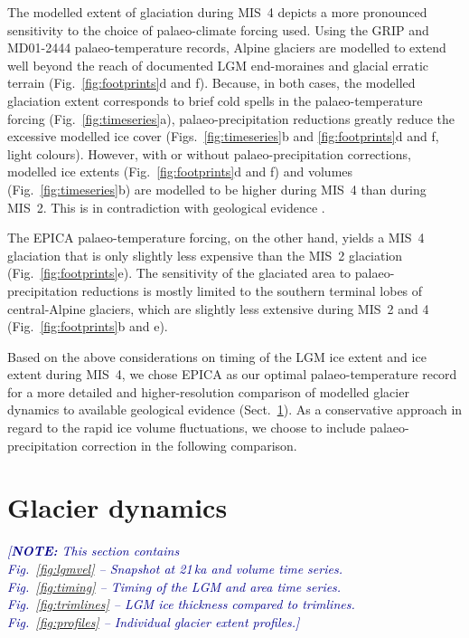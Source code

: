 \documentclass[tc, manuscript]{copernicus}
\newcommand{\note}[1]{\textcolor{darkblue}{\emph{[\textbf{NOTE:} #1]}}}
\begin{document}
    The modelled extent of glaciation during MIS~4 depicts a more pronounced
    sensitivity to the choice of palaeo-climate forcing used. Using the GRIP
    and MD01-2444 palaeo-temperature records, Alpine glaciers are modelled to
    extend well beyond the reach of documented LGM end-moraines and glacial
    erratic terrain (Fig.~\ref{fig:footprints}d and f). Because, in both cases,
    the modelled glaciation extent corresponds to brief cold spells in the
    palaeo-temperature forcing (Fig.~\ref{fig:timeseries}a),
    palaeo-precipitation reductions greatly reduce the excessive modelled ice
    cover (Figs.~\ref{fig:timeseries}b and \ref{fig:footprints}d and f, light
    colours). However, with or without palaeo-precipitation corrections,
    modelled ice extents (Fig.~\ref{fig:footprints}d and f) and volumes
    (Fig.~\ref{fig:timeseries}b) are modelled to be higher during MIS~4 than
    during MIS~2. This is in contradiction with geological evidence
    \citep{Preusser.2004, Ivy-Ochs.etal.2008}.

    The EPICA palaeo-temperature forcing, on the other hand, yields a MIS~4
    glaciation that is only slightly less expensive than the MIS~2 glaciation
    (Fig.~\ref{fig:footprints}e). The sensitivity of the glaciated area to
    palaeo-precipitation reductions is mostly limited to the southern terminal
    lobes of central-Alpine glaciers, which are slightly less extensive during
    MIS~2 and 4 (Fig.~\ref{fig:footprints}b and e).

    Based on the above considerations on timing of the LGM ice extent and ice
    extent during MIS~4, we chose EPICA as our optimal palaeo-temperature
    record for a more detailed and higher-resolution comparison of modelled
    glacier dynamics to available geological evidence
    (Sect.~\ref{sec:results}). As a conservative approach in regard to the
    rapid ice volume fluctuations, we choose to include palaeo-precipitation
    correction in the following comparison.


\section{Glacier dynamics}
\label{sec:results}

    \note{This section contains\\
        Fig.~\ref{fig:lgmvel} -- Snapshot at 21\,ka and volume time series.\\
        Fig.~\ref{fig:timing} -- Timing of the LGM and area time series.\\
        Fig.~\ref{fig:trimlines} -- LGM ice thickness compared to trimlines.\\
        Fig.~\ref{fig:profiles} -- Individual glacier extent profiles.}
\end{document}

